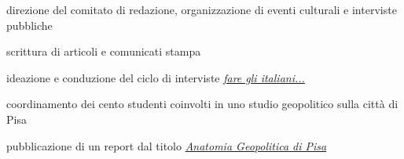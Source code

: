 \documentclass[a4paper]{deedy-resume} %
\begin{document}
\begin{minipage}[t]{0.66\textwidth}
\sectionspace %



\begin{tightitemize}
\item direzione del comitato di redazione, organizzazione di eventi culturali e interviste pubbliche
\item scrittura di articoli e comunicati stampa
\end{tightitemize}

\sectionspace %



\begin{tightitemize}
\item ideazione e conduzione del ciclo di interviste \href{http://www.faretv.net/home/trasmissioni/4-incontri-per-fare-gli-italiani}{\textit{fare gli italiani...}}
\end{tightitemize}

\sectionspace %



\begin{tightitemize}
\item coordinamento dei cento studenti coinvolti in uno studio geopolitico sulla città di Pisa
\item pubblicazione di un report dal titolo \href{http://temi.repubblica.it/limes/la-russia-sovrana/15767}{\textit{Anatomia Geopolitica di Pisa}}
\end{tightitemize}

\sectionspace %




\end{minipage}
\end{document}

